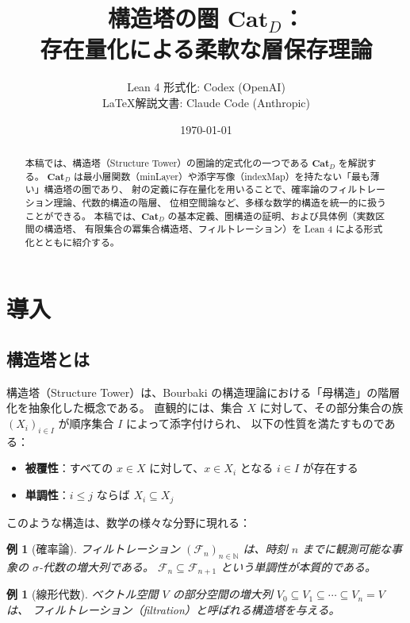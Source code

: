 \documentclass[a4paper,12pt]{ltjsarticle}
\title{構造塔の圏 $\mathbf{Cat}_D$：\\存在量化による柔軟な層保存理論}
\author{
  Lean 4 形式化: Codex (OpenAI) \\
  \LaTeX 解説文書: Claude Code (Anthropic)
}
\date{\today}
\newtheorem{example}[theorem]{例}
\newcommand{\N}{\mathbb{N}}
\begin{document}
\maketitle

\begin{abstract}
本稿では、構造塔（Structure Tower）の圏論的定式化の一つである $\mathbf{Cat}_D$ を解説する。
$\mathbf{Cat}_D$ は最小層関数（minLayer）や添字写像（indexMap）を持たない「最も薄い」構造塔の圏であり、
射の定義に存在量化を用いることで、確率論のフィルトレーション理論、代数的構造の階層、
位相空間論など、多様な数学的構造を統一的に扱うことができる。
本稿では、$\mathbf{Cat}_D$ の基本定義、圏構造の証明、および具体例（実数区間の構造塔、
有限集合の冪集合構造塔、フィルトレーション）を Lean 4 による形式化とともに紹介する。
\end{abstract}

\tableofcontents

\section{導入}

\subsection{構造塔とは}

構造塔（Structure Tower）は、Bourbaki の構造理論における「母構造」の階層化を抽象化した概念である。
直観的には、集合 $X$ に対して、その部分集合の族 $(X_i)_{i \in I}$ が順序集合 $I$ によって添字付けられ、
以下の性質を満たすものである：

\begin{itemize}
  \item \textbf{被覆性}：すべての $x \in X$ に対して、$x \in X_i$ となる $i \in I$ が存在する
  \item \textbf{単調性}：$i \leq j$ ならば $X_i \subseteq X_j$
\end{itemize}

このような構造は、数学の様々な分野に現れる：

\begin{example}[確率論]
フィルトレーション $(\mathcal{F}_n)_{n \in \N}$ は、時刻 $n$ までに観測可能な事象の $\sigma$-代数の増大列である。
$\mathcal{F}_n \subseteq \mathcal{F}_{n+1}$ という単調性が本質的である。
\end{example}

\begin{example}[線形代数]
ベクトル空間 $V$ の部分空間の増大列 $V_0 \subseteq V_1 \subseteq \cdots \subseteq V_n = V$ は、
フィルトレーション（filtration）と呼ばれる構造塔を与える。
\end{example}
\end{document}
